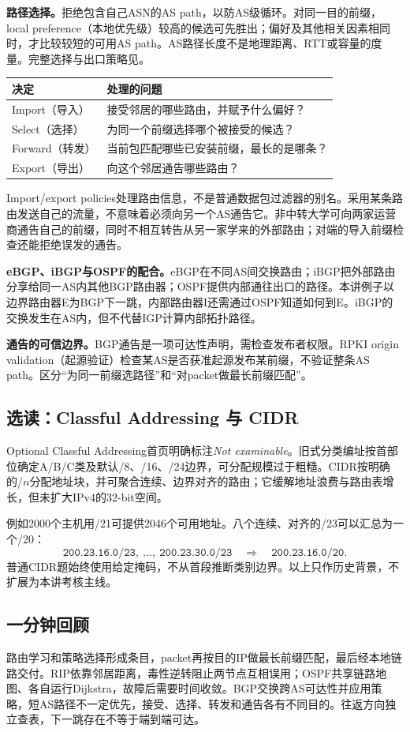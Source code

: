 \textbf{路径选择。}拒绝包含自己ASN的AS path，以防AS级循环。对同一目的前缀，local preference（本地优先级）较高的候选可先胜出；偏好及其他相关因素相同时，才比较较短的可用AS path。AS路径长度不是地理距离、RTT或容量的度量。完整选择与出口策略见。

\begin{center}
\small
\begin{tabularx}{\textwidth}{@{}lX@{}}
\toprule
决定 & 处理的问题 \\
\midrule
Import（导入） & 接受邻居的哪些路由，并赋予什么偏好？\\
Select（选择） & 为同一个前缀选择哪个被接受的候选？\\
Forward（转发） & 当前包匹配哪些已安装前缀，最长的是哪条？\\
Export（导出） & 向这个邻居通告哪些路由？\\
\bottomrule
\end{tabularx}
\end{center}

Import/export policies处理路由信息，不是普通数据包过滤器的别名。采用某条路由发送自己的流量，不意味着必须向另一个AS通告它。非中转大学可向两家运营商通告自己的前缀，同时不相互转告从另一家学来的外部路由；对端的导入前缀检查还能拒绝误发的通告。

\textbf{eBGP、iBGP与OSPF的配合。}eBGP在不同AS间交换路由；iBGP把外部路由分享给同一AS内其他BGP路由器；OSPF提供内部通往出口的路径。本讲例子以边界路由器E为BGP下一跳，内部路由器I还需通过OSPF知道如何到E。iBGP的交换发生在AS内，但不代替IGP计算内部拓扑路径。

\textbf{通告的可信边界。}BGP通告是一项可达性声明，需检查发布者权限。RPKI origin validation（起源验证）检查某AS是否获准起源发布某前缀，不验证整条AS path。区分“为同一前缀选路径”和“对packet做最长前缀匹配”。

\subsection{选读：Classful Addressing 与 CIDR}

Optional Classful Addressing首页明确标注\emph{Not examinable}。旧式分类编址按首部位确定A/B/C类及默认/8、/16、/24边界，可分配规模过于粗糙。CIDR按明确的/$n$分配地址块，并可聚合连续、边界对齐的路由；它缓解地址浪费与路由表增长，但未扩大IPv4的32-bit空间。

例如2000个主机用/21可提供2046个可用地址。八个连续、对齐的/23可以汇总为一个/20：
\[
 \texttt{200.23.16.0/23},\ \ldots,\ \texttt{200.23.30.0/23}
 \quad\Longrightarrow\quad\texttt{200.23.16.0/20}.
\]
普通CIDR题始终使用给定掩码，不从首段推断类别边界。以上只作历史背景，不扩展为本讲考核主线。

\subsection{一分钟回顾}

路由学习和策略选择形成条目，packet再按目的IP做最长前缀匹配，最后经本地链路交付。RIP依靠邻居距离，毒性逆转阻止两节点互相误用；OSPF共享链路地图、各自运行Dijkstra，故障后需要时间收敛。BGP交换跨AS可达性并应用策略，短AS路径不一定优先，接受、选择、转发和通告各有不同目的。往返方向独立查表，下一跳存在不等于端到端可达。
\endgroup
